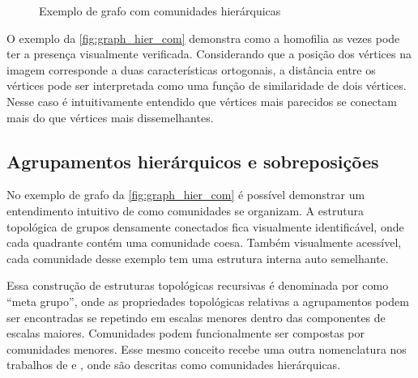 \documentclass[notes.tex]{subfiles}
\begin{document}
\begin{figure}[htpb]
    \centering
    \caption{Exemplo de grafo com comunidades hierárquicas}\label{fig:graph_hier_com}
\end{figure}

O exemplo da \autoref{fig:graph_hier_com} demonstra como a homofilia as vezes pode ter a presença visualmente verificada.
Considerando que a posição dos vértices na imagem corresponde a duas características ortogonais, a distância entre os vértices pode ser interpretada como uma função de similaridade de dois vértices.
Nesse caso é intuitivamente entendido que vértices mais parecidos se conectam mais do que vértices mais dissemelhantes.

\subsection{Agrupamentos hierárquicos e sobreposições}

No exemplo de grafo da \autoref{fig:graph_hier_com} é possível demonstrar um entendimento intuitivo de como comunidades se organizam.
A estrutura topológica de grupos densamente conectados fica visualmente identificável, onde cada quadrante contém uma comunidade coesa.
Também visualmente acessível, cada comunidade desse exemplo tem uma estrutura interna auto semelhante.

Essa construção de estruturas topológicas recursivas é denominada por  como ``meta grupo'', onde as propriedades topológicas relativas a agrupamentos podem ser encontradas se repetindo em escalas menores dentro das componentes de escalas maiores.
Comunidades podem funcionalmente ser compostas por comunidades menores.
Esse mesmo conceito recebe uma outra nomenclatura nos trabalhos de  e , onde são descritas como comunidades hierárquicas.
\end{document}
